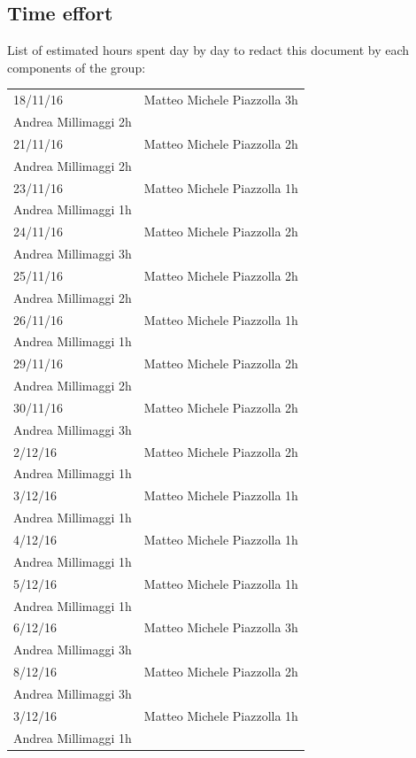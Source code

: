 \documentclass[english]{article}
\providecommand{\tabularnewline}{\\}
\begin{document}
	\subsection{Time effort}
	List of estimated hours spent day by day to redact this document by each components of the group:
	\begin{center}
		\begin{adjustbox}{max width=\textwidth}	
			\begin{tabular}{|l|>{\raggedright}p{15cm}|}
      \hline  18/11/16 & Matteo Michele Piazzolla 3h \\ Andrea Millimaggi 2h \tabularnewline
      \hline  21/11/16 & Matteo Michele Piazzolla 2h \\ Andrea Millimaggi 2h \tabularnewline
      \hline  23/11/16 & Matteo Michele Piazzolla 1h \\ Andrea Millimaggi 1h \tabularnewline
      \hline  24/11/16 & Matteo Michele Piazzolla 2h \\ Andrea Millimaggi 3h \tabularnewline
      \hline  25/11/16 & Matteo Michele Piazzolla 2h \\ Andrea Millimaggi 2h \tabularnewline
      \hline  26/11/16 & Matteo Michele Piazzolla 1h \\ Andrea Millimaggi 1h \tabularnewline
      \hline  29/11/16 & Matteo Michele Piazzolla 2h \\ Andrea Millimaggi 2h \tabularnewline
      \hline  30/11/16 & Matteo Michele Piazzolla 2h \\ Andrea Millimaggi 3h \tabularnewline
      \hline  2/12/16 & Matteo Michele Piazzolla 2h \\ Andrea Millimaggi 1h \tabularnewline
      \hline  3/12/16 & Matteo Michele Piazzolla 1h \\ Andrea Millimaggi 1h \tabularnewline
      \hline  4/12/16 & Matteo Michele Piazzolla 1h \\ Andrea Millimaggi 1h \tabularnewline
      \hline  5/12/16 & Matteo Michele Piazzolla 1h \\ Andrea Millimaggi 1h \tabularnewline
      \hline  6/12/16 & Matteo Michele Piazzolla 3h \\ Andrea Millimaggi 3h \tabularnewline
      \hline  8/12/16 & Matteo Michele Piazzolla 2h \\ Andrea Millimaggi 3h \tabularnewline
      \hline  3/12/16 & Matteo Michele Piazzolla 1h \\ Andrea Millimaggi 1h \tabularnewline
   
   
   
   
      
      
      
      
      


				
				
				\hline 
			\end{tabular}
		\end{adjustbox}
	\end{center}	
	
	
\end{document}
